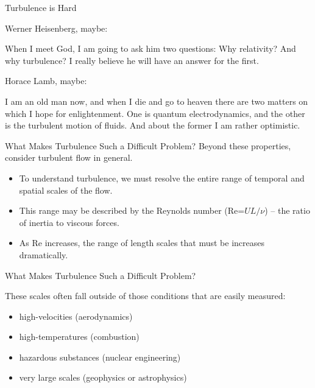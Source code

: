 \begin{frame}{Turbulence is Hard}

Werner Heisenberg, maybe:
\begin{fancyquotes}
	When I meet God, I am going to ask him two questions: Why relativity? And why turbulence? I really believe he will have an answer for the first.
\end{fancyquotes}

Horace Lamb, maybe:
\begin{fancyquotes}
	I am an old man now, and when I die and go to heaven there are two matters on which I hope for enlightenment. One is quantum electrodynamics, and the other is the turbulent motion of fluids. And about the former I am rather optimistic.
\end{fancyquotes}

\end{frame}
\begin{frame}{What Makes Turbulence Such a Difficult Problem?}
  Beyond these properties, consider turbulent flow in general.
  \begin{itemize}
  \item To understand turbulence, we must resolve the entire range of temporal and spatial scales of the flow. 
  \item This range may be described by the Reynolds number (Re=$UL/\nu$) -- the ratio of inertia to viscous forces.  
  \item As Re increases, the range of length scales that must be increases dramatically.
  \end{itemize}
\end{frame}


\begin{frame}{What Makes Turbulence Such a Difficult Problem?}
  
  These scales often fall outside of those conditions that are easily measured:
  \begin{itemize}
  	\item high-velocities (aerodynamics)
  	\item high-temperatures (combustion)
  	\item hazardous substances (nuclear engineering)
  	\item very large scales (geophysics or astrophysics)
  \end{itemize}
  ~\\~\\
   
\end{frame}

